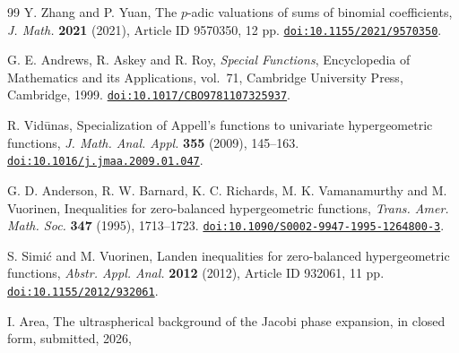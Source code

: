 \documentclass[12pt]{amsart}
\theoremstyle{definition}
\theoremstyle{remark}
\newcommand{\doi}[1]{\href{https://doi.org/#1}{\nolinkurl{doi:#1}}}
\begin{document}
\begin{thebibliography}{99}
Y. Zhang and P. Yuan,
The $p$-adic valuations of sums of binomial coefficients,
\emph{J. Math.} \textbf{2021} (2021), Article ID 9570350, 12 pp.
\doi{10.1155/2021/9570350}.


G. E. Andrews, R. Askey and R. Roy,
\emph{Special Functions},
Encyclopedia of Mathematics and its Applications, vol.~71,
Cambridge University Press, Cambridge, 1999.
\doi{10.1017/CBO9781107325937}.

R. Vid\=unas,
Specialization of Appell's functions to univariate hypergeometric functions,
\emph{J. Math. Anal. Appl.} \textbf{355} (2009), 145--163.
\doi{10.1016/j.jmaa.2009.01.047}.

G. D. Anderson, R. W. Barnard, K. C. Richards,
M. K. Vamanamurthy and M. Vuorinen,
Inequalities for zero-balanced hypergeometric functions,
\emph{Trans. Amer. Math. Soc.} \textbf{347} (1995), 1713--1723.
\doi{10.1090/S0002-9947-1995-1264800-3}.

S. Simi\'c and M. Vuorinen,
Landen inequalities for zero-balanced hypergeometric functions,
\emph{Abstr. Appl. Anal.} \textbf{2012} (2012), Article ID 932061, 11 pp.
\doi{10.1155/2012/932061}.

I. Area,
The ultraspherical background of the Jacobi phase expansion, in closed form,
submitted, 2026, %
\end{thebibliography}
\end{document}
